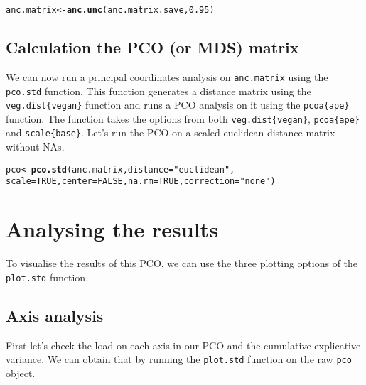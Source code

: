 \documentclass[a4paper,11pt]{article}\usepackage[]{graphicx}\usepackage[]{color}
\makeatletter
\newcommand{\hlnum}[1]{\textcolor[rgb]{0.686,0.059,0.569}{#1}}%
\newcommand{\hlstr}[1]{\textcolor[rgb]{0.192,0.494,0.8}{#1}}%
\newcommand{\hlstd}[1]{\textcolor[rgb]{0.345,0.345,0.345}{#1}}%
\newcommand{\hlkwb}[1]{\textcolor[rgb]{0.69,0.353,0.396}{#1}}%
\newcommand{\hlkwc}[1]{\textcolor[rgb]{0.333,0.667,0.333}{#1}}%
\newcommand{\hlkwd}[1]{\textcolor[rgb]{0.737,0.353,0.396}{\textbf{#1}}}%
\newenvironment{kframe}{%
 \def\at@end@of@kframe{}%
 \ifinner\ifhmode%
  \def\at@end@of@kframe{\end{minipage}}%
  \begin{minipage}{\columnwidth}%
 \fi\fi%
 \def\FrameCommand##1{\hskip\@totalleftmargin \hskip-\fboxsep
 \colorbox{shadecolor}{##1}\hskip-\fboxsep
     \hskip-\linewidth \hskip-\@totalleftmargin \hskip\columnwidth}%
 \MakeFramed {\advance\hsize-\width
   \@totalleftmargin\z@ \linewidth\hsize
   \@setminipage}}%
 {\par\unskip\endMakeFramed%
 \at@end@of@kframe}
\newenvironment{knitrout}{}{} %
\makeatother
\begin{document}
\begin{knitrout}
\color{fgcolor}\begin{kframe}
\begin{alltt}
\hlstd{anc.matrix}\hlkwb{<-}\hlkwd{anc.unc}\hlstd{(anc.matrix.save,} \hlnum{0.95}\hlstd{)}
\end{alltt}
\end{kframe}
\end{knitrout}

\subsection{Calculation the PCO (or MDS) matrix}
We can now run a principal coordinates analysis on \texttt{anc.matrix} using the \texttt{pco.std} function.
This function generates a distance matrix using the \texttt{veg.dist\{vegan\}} function and runs a PCO analysis on it using the \texttt{pcoa\{ape\}} function.
The function takes the options from both \texttt{veg.dist\{vegan\}}, \texttt{pcoa\{ape\}} and \texttt{scale\{base\}}.
Let's run the PCO on a scaled euclidean distance matrix without NAs.

\begin{knitrout}
\color{fgcolor}\begin{kframe}
\begin{alltt}
\hlstd{pco}\hlkwb{<-}\hlkwd{pco.std}\hlstd{(anc.matrix,} \hlkwc{distance}\hlstd{=}\hlstr{"euclidean"}\hlstd{,}
    \hlkwc{scale}\hlstd{=}\hlnum{TRUE}\hlstd{,} \hlkwc{center}\hlstd{=}\hlnum{FALSE}\hlstd{,} \hlkwc{na.rm}\hlstd{=}\hlnum{TRUE}\hlstd{,} \hlkwc{correction}\hlstd{=}\hlstr{"none"}\hlstd{)}
\end{alltt}
\end{kframe}
\end{knitrout}

\section{Analysing the results}
To visualise the results of this PCO, we can use the three plotting options of the \texttt{plot.std} function.

\subsection{Axis analysis}
First let's check the load on each axis in our PCO and the cumulative explicative variance.
We can obtain that by running the \texttt{plot.std} function on the raw \texttt{pco} object.
\end{document}
